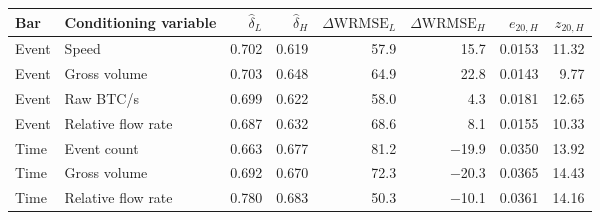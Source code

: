 \begin{tabular}{llrrrrrr}
\toprule
Bar & Conditioning variable & $\widehat{\delta}_{L}$ & $\widehat{\delta}_{H}$ & $\Delta\mathrm{WRMSE}_{L}$ & $\Delta\mathrm{WRMSE}_{H}$ & $e_{20,H}$ & $z_{20,H}$ \\
\midrule
Event & Speed & 0.702 & 0.619 & 57.9 & 15.7 & 0.0153 & 11.32 \\
Event & Gross volume & 0.703 & 0.648 & 64.9 & 22.8 & 0.0143 & 9.77 \\
Event & Raw BTC/s & 0.699 & 0.622 & 58.0 & 4.3 & 0.0181 & 12.65 \\
Event & Relative flow rate & 0.687 & 0.632 & 68.6 & 8.1 & 0.0155 & 10.33 \\
\midrule
Time & Event count & 0.663 & 0.677 & 81.2 & $-$19.9 & 0.0350 & 13.92 \\
Time & Gross volume & 0.692 & 0.670 & 72.3 & $-$20.3 & 0.0365 & 14.43 \\
Time & Relative flow rate & 0.780 & 0.683 & 50.3 & $-$10.1 & 0.0361 & 14.16 \\
\bottomrule
\end{tabular}
